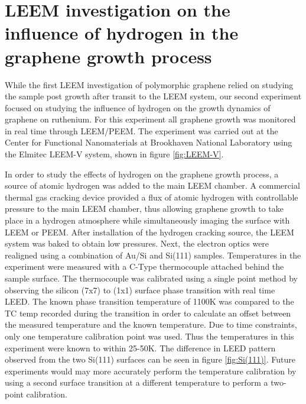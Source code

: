 \section{LEEM investigation on the influence of hydrogen in the graphene growth process}
While the first LEEM investigation of polymorphic graphene relied on studying the sample post growth after transit to the LEEM system, our second experiment focused on studying the influence of hydrogen on the growth dynamics of graphene on ruthenium. For this experiment all graphene growth was monitored in real time through LEEM/PEEM. The experiment was carried out at the Center for Functional Nanomaterials at Brookhaven National Laboratory using the Elmitec LEEM-V system, shown in figure \ref{fig:LEEM-V}.

In order to study the effects of hydrogen on the graphene growth process, a source of atomic hydrogen was added to the main LEEM chamber. A commercial thermal gas cracking device provided a flux of atomic hydrogen with controllable pressure to the main LEEM chamber, thus allowing graphene growth to take place in a hydrogen atmosphere while simultaneously imaging the surface with LEEM or PEEM. After installation of the hydrogen cracking source, the LEEM system was baked to obtain low pressures. Next, the electron optics were realigned using a combination of Au/Si and Si(111) samples. Temperatures in the experiment were measured with a C-Type thermocouple attached behind the sample surface. The thermocouple was calibrated using a single point method by observing the silicon (7x7) to (1x1) surface phase transition with real time LEED. The known phase transition temperature of 1100K \cite{Si111} was compared to the TC temp recorded during the transition in order to calculate an offset between the measured temperature and the known temperature. Due to time constraints, only one temperature calibration point was used. Thus the temperatures in this experiment were known to within 25-50K. The difference in LEED pattern observed from the two Si(111) surfaces can be seen in figure \ref{fig:Si(111)}. Future experiments would may more accurately perform the temperature calibration by using a second surface transition at a different temperature to perform a two-point calibration.


